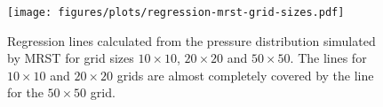 \begin{figure}[htbp]
    \centering
    \texttt{[image: figures/plots/regression-mrst-grid-sizes.pdf]}
    \caption{Regression lines calculated from the pressure distribution simulated by MRST for grid sizes $10\times 10$, $20\times 20$ and $50\times 50$. The lines for $10\times 10$ and $20\times 20$ grids are almost completely covered by the line for the $50 \times 50$ grid.}
    \label{fig:regression-mrst-grid-sizes}
\end{figure}



